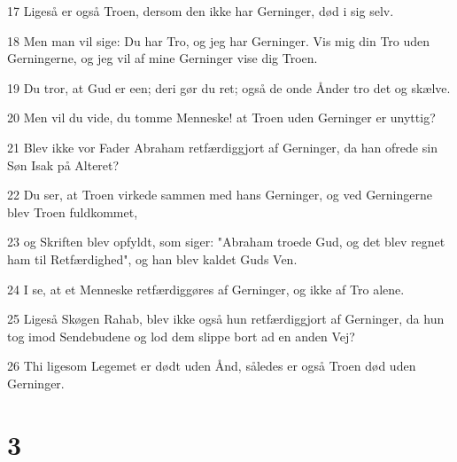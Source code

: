 \par 17 Ligeså er også Troen, dersom den ikke har Gerninger, død i sig selv.
\par 18 Men man vil sige: Du har Tro, og jeg har Gerninger. Vis mig din Tro uden Gerningerne, og jeg vil af mine Gerninger vise dig Troen.
\par 19 Du tror, at Gud er een; deri gør du ret; også de onde Ånder tro det og skælve.
\par 20 Men vil du vide, du tomme Menneske! at Troen uden Gerninger er unyttig?
\par 21 Blev ikke vor Fader Abraham retfærdiggjort af Gerninger, da han ofrede sin Søn Isak på Alteret?
\par 22 Du ser, at Troen virkede sammen med hans Gerninger, og ved Gerningerne blev Troen fuldkommet,
\par 23 og Skriften blev opfyldt, som siger: "Abraham troede Gud, og det blev regnet ham til Retfærdighed", og han blev kaldet Guds Ven.
\par 24 I se, at et Menneske retfærdiggøres af Gerninger, og ikke af Tro alene.
\par 25 Ligeså Skøgen Rahab, blev ikke også hun retfærdiggjort af Gerninger, da hun tog imod Sendebudene og lod dem slippe bort ad en anden Vej?
\par 26 Thi ligesom Legemet er dødt uden Ånd, således er også Troen død uden Gerninger.

\chapter{3}

